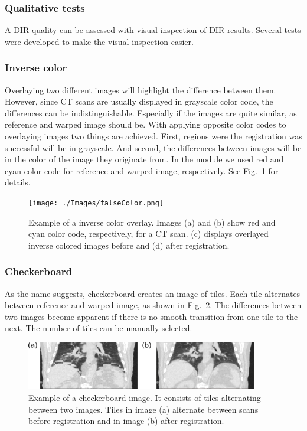 \documentclass[type=dr, dr=rernat, accentcolor=tud7b,colorbacktitle, bigchapter, openright, twoside, 12pt ]{tudthesis}
\begin{document}
\subsubsection{Qualitative tests}

A DIR quality can be assessed with visual inspection of DIR results. Several tests were developed to make the visual inspection easier.

\subsubsection{Inverse color}


Overlaying two different images will highlight the difference between them. However, since CT scans are usually displayed in grayscale color code, the differences can be indistinguishable. Especially if the images are quite similar, as reference and warped image should be. With applying opposite color codes to overlaying images two things are achieved. First, regions were the registration was successful will be in grayscale. And second, the differences between images will be in the color of the image they originate from. In the module we used red and cyan color code for reference and warped image, respectively. See Fig.~\ref{falseColor} for details.

\newpage
\begin{figure}[H]
	\begin{center}		
		\texttt{[image: ./Images/falseColor.png]}
		\caption{Example of a inverse color overlay. Images (a) and (b) show red and cyan color code, respectively, for a CT scan. (c) displays overlayed inverse colored images before and (d) after registration.}
		\label{falseColor}
	\end{center}
\end{figure}

\subsubsection{Checkerboard}

As the name suggests, checkerboard creates an image of tiles. Each tile alternates between reference and warped image, as shown in Fig.~\ref{checkerboard}. The differences between two images become apparent if there is no smooth transition from one tile to the next. 
The number of tiles can be manually selected.

\begin{figure}[H]
	\begin{center}		
		\includegraphics[width=0.9\textwidth]{./Images/checkerboard.png}
		\caption{Example of a checkerboard image. It consists of tiles alternating between two images. Tiles in image (a) alternate between scans before registration and in image (b) after registration.}
		\label{checkerboard}
	\end{center}
\end{figure}
\end{document}
